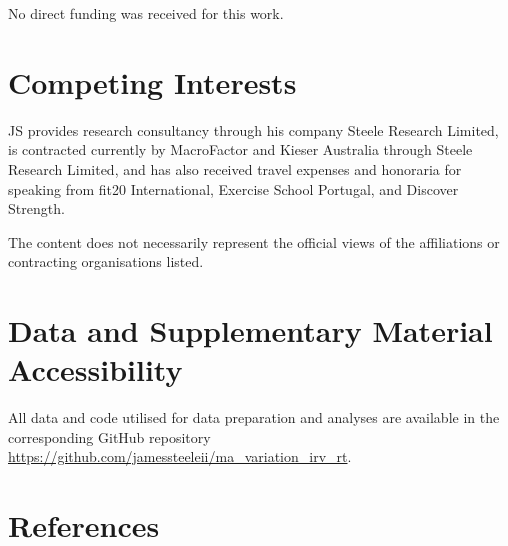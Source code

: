 \documentclass[
]{article}
\begin{document}
No direct funding was received for this work.

\section{Competing Interests}\label{competing-interests}

JS provides research consultancy through his company Steele Research
Limited, is contracted currently by MacroFactor and Kieser Australia
through Steele Research Limited, and has also received travel expenses
and honoraria for speaking from fit20 International, Exercise School
Portugal, and Discover Strength.

The content does not necessarily represent the official views of the
affiliations or contracting organisations listed.

\section{Data and Supplementary Material
Accessibility}\label{data-and-supplementary-material-accessibility}

All data and code utilised for data preparation and analyses are
available in the corresponding GitHub repository
\url{https://github.com/jamessteeleii/ma_variation_irv_rt}.

\section{References}\label{references}
\end{document}
